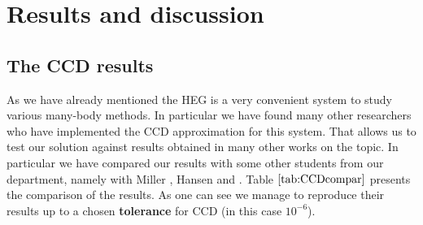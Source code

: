 \chapter{Results and discussion} \label{sec:Results}

\section{The CCD results}
As we have already mentioned the HEG is a very convenient system to
study various many-body methods. In particular we have found many
other researchers who have implemented the CCD approximation for this
system. That allows us to test our solution against results obtained
in many other works on the topic. In particular we have compared our
results with some other students from our department, namely with
Miller \cite{millerAntumMechanicalStudies}, Hansen
\cite{hansenCoupledClusterStudies} and
\cite{gustavbaardsenCoupledclusterTheoryInfinite2014}. Table
$\ref{tab:CCDcompar}$ presents the comparison of the results. As one
can see we manage to reproduce their results up to a chosen
\textbf{tolerance} for CCD (in this case $10^{-6}$).


